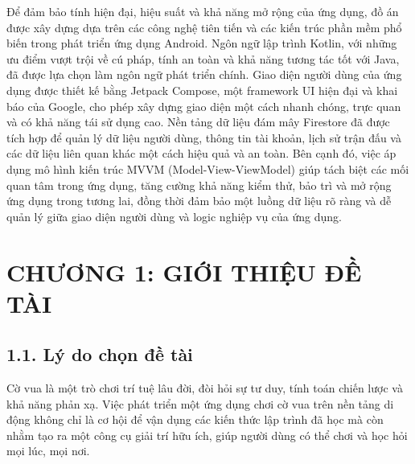 \documentclass[a4paper,12pt]{article}
\begin{document}
\noindent Để đảm bảo tính hiện đại, hiệu suất và khả năng mở rộng của ứng dụng, đồ án được xây dựng dựa trên các công nghệ tiên tiến và các kiến trúc phần mềm phổ biến trong phát triển ứng dụng Android. Ngôn ngữ lập trình Kotlin, với những ưu điểm vượt trội về cú pháp, tính an toàn và khả năng tương tác tốt với Java, đã được lựa chọn làm ngôn ngữ phát triển chính. Giao diện người dùng của ứng dụng được thiết kế bằng Jetpack Compose, một framework UI hiện đại và khai báo của Google, cho phép xây dựng giao diện một cách nhanh chóng, trực quan và có khả năng tái sử dụng cao. Nền tảng dữ liệu đám mây Firestore đã được tích hợp để quản lý dữ liệu người dùng, thông tin tài khoản, lịch sử trận đấu và các dữ liệu liên quan khác một cách hiệu quả và an toàn. Bên cạnh đó, việc áp dụng mô hình kiến trúc MVVM (Model-View-ViewModel) giúp tách biệt các mối quan tâm trong ứng dụng, tăng cường khả năng kiểm thử, bảo trì và mở rộng ứng dụng trong tương lai, đồng thời đảm bảo một luồng dữ liệu rõ ràng và dễ quản lý giữa giao diện người dùng và logic nghiệp vụ của ứng dụng.

\bigskip %


\newpage %

\setcounter{page}{1} %

\section*{\centering \textbf{CHƯƠNG 1: GIỚI THIỆU ĐỀ TÀI}} %


\subsection*{1.1. Lý do chọn đề tài} %

\justify %
\noindent Cờ vua là một trò chơi trí tuệ lâu đời, đòi hỏi sự tư duy, tính toán chiến lược và khả năng phản xạ. Việc phát triển một ứng dụng chơi cờ vua trên nền tảng di động không chỉ là cơ hội để vận dụng các kiến thức lập trình đã học mà còn nhằm tạo ra một công cụ giải trí hữu ích, giúp người dùng có thể chơi và học hỏi mọi lúc, mọi nơi.
\end{document}
